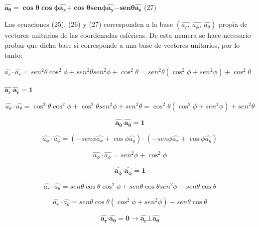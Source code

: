 \documentclass[]{article}
\begin{document}
\(\widehat{\mathbf{a}_{\mathbf{\theta}}}\mathbf{=}\mathbf{\cos}\mathbf{\theta}\mathbf{\cos}\mathbf{\phi}\widehat{\mathbf{a}_{\mathbf{x}}}\mathbf{+}\mathbf{\cos}\mathbf{\theta}\mathbf{sen}\mathbf{\phi}\widehat{\mathbf{a}_{\mathbf{y}}}\mathbf{-}\mathbf{sen}\mathbf{\theta}\widehat{\mathbf{a}_{\mathbf{z}}}\)
(27)

Las ecuaciones (25), (26) y (27) corresponden a la base
\(\left( \widehat{a_{r},}\ \widehat{a_{\phi},}\ \widehat{a_{\theta}} \right)\)
propia de vectores unitarios de las coordenadas esféricas. De esta
manera se hace necesario probar que dicha base si corresponde a una base
de vectores unitarios, por lo tanto:

\(\widehat{a_{r}} \cdot \widehat{a_{r}} = {sen}^{2}\theta\cos^{2}\phi + {sen}^{2}\theta{sen}^{2}\phi + \cos^{2}\theta\)\(= {sen}^{2}\theta\left( \cos^{2}\phi + {sen}^{2}\phi \right) + \cos^{2}\theta\)

\(\widehat{\mathbf{a}_{\mathbf{r}}}\mathbf{\cdot}\widehat{\mathbf{a}_{\mathbf{r}}}\mathbf{= 1}\)

\textbf{\hfill\break
}

\[\widehat{a_{\theta}} \cdot \widehat{a_{\theta}} = \cos^{2}\theta\cos^{2}\phi + \cos^{2}\theta{sen}^{2}\phi + {sen}^{2}\theta = \cos^{2}\theta\left( \cos^{2}\phi + {sen}^{2}\phi \right) + {sen}^{2}\theta\]

\[\widehat{\mathbf{a}_{\mathbf{\theta}}}\mathbf{\cdot}\widehat{\mathbf{a}_{\mathbf{\theta}}}\mathbf{= 1}\]

\[\widehat{a_{\phi}} \cdot \widehat{a_{\phi}} = \left( - {sen}\phi\widehat{a_{x}} + \cos\phi\widehat{a_{y}} \right) \cdot ( - {sen}\phi\widehat{a_{x}} + \cos\phi\widehat{a_{y}})\]

\[\widehat{a_{\phi}} \cdot \widehat{a_{\phi}} = {sen}^{2}\phi + \cos^{2}\phi\]

\[\widehat{\mathbf{a}_{\mathbf{\phi}}}\mathbf{\cdot}\widehat{\mathbf{a}_{\mathbf{\phi}}}\mathbf{= 1}\]

\[\widehat{a_{r}} \cdot \widehat{a_{\theta}} = {sen}\theta\cos\theta\cos^{2}\phi + {sen}\theta\cos\theta{sen}^{2}\phi - {sen}\theta\cos\theta\]

\[\widehat{a_{r}} \cdot \widehat{a_{\theta}} = {sen}\theta\cos\theta(\cos^{2}\phi + {sen}^{2}\phi) - {sen}\theta\cos\theta\]

\[\widehat{\mathbf{a}_{\mathbf{r}}}\mathbf{\cdot}\widehat{\mathbf{a}_{\mathbf{\theta}}}\mathbf{= 0 \rightarrow}\widehat{\mathbf{a}_{\mathbf{r}}}\mathbf{\bot}\widehat{\mathbf{a}_{\mathbf{\theta}}}\]
\end{document}
